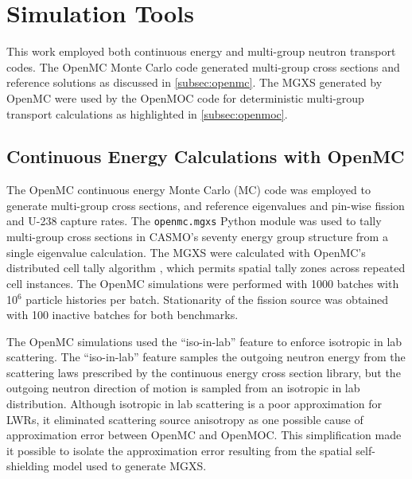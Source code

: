 \section{Simulation Tools}
\label{sec:simulation-tools}

This work employed both continuous energy and multi-group neutron transport codes. The OpenMC Monte Carlo code generated multi-group cross sections and reference solutions as discussed in \autoref{subsec:openmc}. The MGXS generated by OpenMC were used by the OpenMOC code for deterministic multi-group transport calculations as highlighted in \autoref{subsec:openmoc}.


\subsection{Continuous Energy Calculations with OpenMC}
\label{subsec:openmc}

The OpenMC continuous energy Monte Carlo (MC) code \citep{romano2013openmc} was employed to generate multi-group cross sections, and reference eigenvalues and pin-wise fission and U-238 capture rates. The \texttt{openmc.mgxs} Python module \citep{boyd2018openmcmgxs} was used to tally multi-group cross sections in CASMO's seventy energy group structure \citep{rhodes2006casmo} from a single eigenvalue calculation. The MGXS were calculated with OpenMC's distributed cell tally algorithm \citep{lax2014distribcell}, which permits spatial tally zones across repeated cell instances. The OpenMC simulations were performed with 1000 batches with 10$^{6}$ particle histories per batch. Stationarity of the fission source was obtained with 100 inactive batches for both benchmarks.

The OpenMC simulations used the ``iso-in-lab'' feature to enforce isotropic in lab scattering. The ``iso-in-lab'' feature samples the outgoing neutron energy from the scattering laws prescribed by the continuous energy cross section library, but the outgoing neutron direction of motion is sampled from an isotropic in lab distribution. Although isotropic in lab scattering is a poor approximation for LWRs, it eliminated scattering source anisotropy as one possible cause of approximation error between OpenMC and OpenMOC. This simplification made it possible to isolate the approximation error resulting from the spatial self-shielding model used to generate MGXS.


